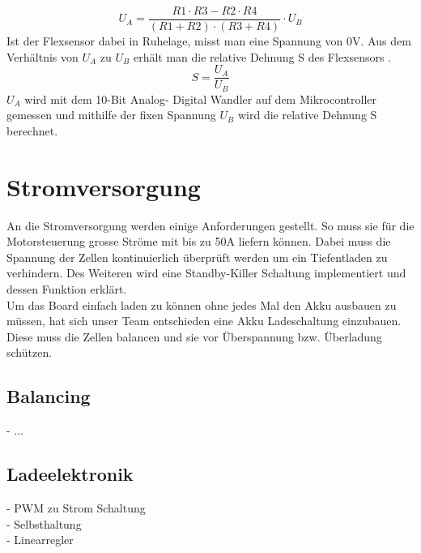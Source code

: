 \begin{equation}\label{glg_U_A}
 U_A=\frac{R1 \cdot R3-R2 \cdot R4}{(R1+R2) \cdot (R3+R4)} \cdot U_B 
\end{equation}
Ist der Flexsensor dabei in Ruhelage, misst man eine Spannung von 0V. Aus dem Verhältnis von $ U_A $ zu $ U_B $ erhält man die relative Dehnung S des Flexsensors .
\begin{equation}\label{S_relativeDehnung}
S=\frac{U_A}{U_B}
\end{equation}
$U_A$ wird mit dem 10-Bit Analog- Digital Wandler auf dem Mikrocontroller gemessen und mithilfe der fixen Spannung $U_B$ wird die relative Dehnung S berechnet. 


\section{Stromversorgung}
\label{HW_Stromversorgung}
An die Stromversorgung werden einige Anforderungen gestellt. So muss sie für die Motorsteuerung grosse Ströme mit bis zu 50A liefern können. Dabei muss die Spannung der Zellen kontinuierlich überprüft werden um ein Tiefentladen zu verhindern. Des Weiteren wird eine Standby-Killer Schaltung implementiert und dessen Funktion erklärt.\\
Um das Board einfach laden zu können ohne jedes Mal den Akku ausbauen zu müssen, hat sich unser Team entschieden eine Akku Ladeschaltung einzubauen. Diese muss die Zellen balancen und sie vor Überspannung bzw. Überladung schützen. 
\subsection*{Balancing}
- ...
\subsection*{Ladeelektronik}
-	PWM zu Strom Schaltung\\
-	Selbsthaltung\\
-	Linearregler

